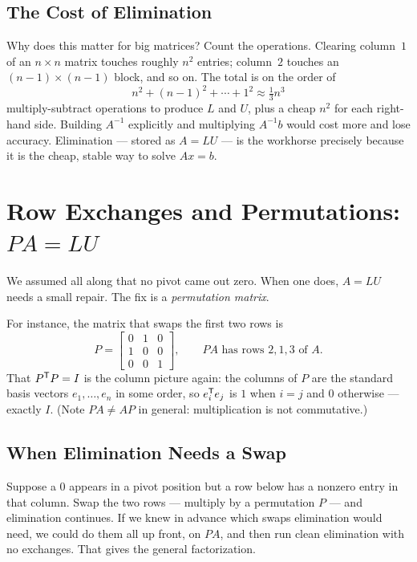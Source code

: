 \subsection{The Cost of Elimination}

Why does this matter for big matrices? Count the operations. Clearing column~$1$ of an $n\times n$ matrix touches roughly $n^2$ entries; column~$2$ touches an $(n-1)\times(n-1)$ block, and so on. The total is on the order of
\[
n^2+(n-1)^2+\cdots+1^2 \approx \tfrac13 n^3
\]
multiply-subtract operations to produce $L$ and $U$, plus a cheap $n^2$ for each right-hand side. Building $A^{-1}$ explicitly and multiplying $A^{-1}b$ would cost more and lose accuracy. Elimination --- stored as $A=LU$ --- is the workhorse precisely because it is the cheap, stable way to solve $Ax=b$.

\section{Row Exchanges and Permutations: $PA = LU$}
\label{sec:ch2-perm}

We assumed all along that no pivot came out zero. When one does, $A=LU$ needs a small repair. The fix is a \emph{permutation matrix}.

For instance, the matrix that swaps the first two rows is
\[
P=\begin{bmatrix} 0 & 1 & 0\\ 1 & 0 & 0\\ 0 & 0 & 1\end{bmatrix},
\qquad
PA \text{ has rows } 2,1,3 \text{ of } A.
\]
That $P^{\mathsf T} P=I$ is the column picture again: the columns of $P$ are the standard basis vectors $e_1,\dots,e_n$ in some order, so $e_i^{\mathsf T} e_j$ is $1$ when $i=j$ and $0$ otherwise --- exactly $I$. (Note $PA\ne AP$ in general: multiplication is not commutative.)

\subsection{When Elimination Needs a Swap}

Suppose a $0$ appears in a pivot position but a row below has a nonzero entry in that column. Swap the two rows --- multiply by a permutation $P$ --- and elimination continues. If we knew in advance which swaps elimination would need, we could do them all up front, on $PA$, and then run clean elimination with no exchanges. That gives the general factorization.

